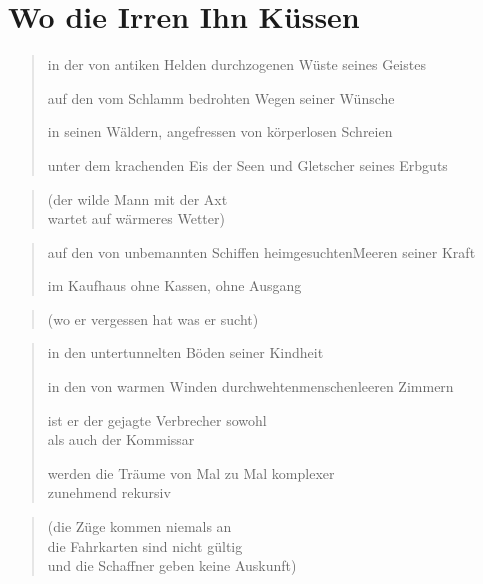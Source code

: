 
{\setlength{\stanzaskip}{0.5em}


\cleartoverso

\section{Wo die Irren Ihn Küssen}

\begin{verse}
in der von antiken Helden durchzogenen Wüste seines Geistes

auf den vom Schlamm bedrohten Wegen seiner Wünsche

in seinen Wäldern, angefressen von körperlosen Schreien

unter dem krachenden Eis der Seen und Gletscher seines Erbguts
\end{verse}

\begin{quote}
(der wilde Mann mit der Axt\\
wartet auf wärmeres Wetter)
\end{quote}

\begin{verse}
auf den von unbemannten Schiffen heimgesuchten\verselinebreak Meeren seiner Kraft

im Kaufhaus ohne Kassen, ohne Ausgang
\end{verse}

\begin{quote}
(wo er vergessen hat was er sucht)
\end{quote}

\begin{verse}
in den untertunnelten Böden seiner Kindheit

in den von warmen Winden durchwehten\verselinebreak menschenleeren Zimmern

ist er der gejagte Verbrecher sowohl\\
als auch der Kommissar

werden die Träume von Mal zu Mal komplexer\\
zunehmend rekursiv
\end{verse}

\restoregeometry
\clearpage

\begin{quote}
(die Züge kommen niemals an\\
die Fahrkarten sind nicht gültig\\
und die Schaffner geben keine Auskunft)
\end{quote}

}
